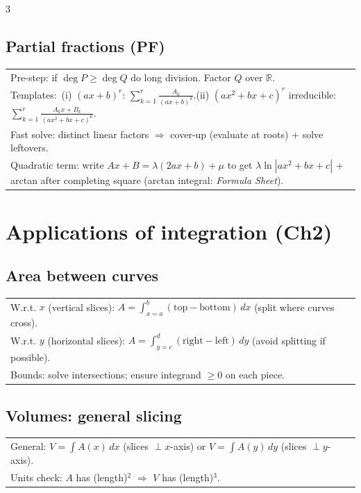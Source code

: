 \documentclass[10pt]{article}
\newcommand{\R}{\mathbb{R}}
\newcommand{\FS}{\textit{Formula Sheet}}
\begin{document}
\begin{multicols}{3}
\subsection*{Partial fractions (PF)}
\vspace{-1pt}
\begin{tabular}{@{}p{}@{}}
Pre-step: if $\deg P\ge\deg Q$ do long division. Factor $Q$ over $\R$.\\
Templates:\ (i) $(ax+b)^r$: $\sum_{k=1}^r \frac{A_k}{(ax+b)^k}$.\quad (ii) $(ax^2+bx+c)^r$ irreducible: $\sum_{k=1}^r \frac{A_k x+B_k}{(ax^2+bx+c)^k}$.\\
Fast solve: distinct linear factors $\Rightarrow$ cover-up (evaluate at roots) + solve leftovers.\\
Quadratic term: write $Ax+B=\lambda(2ax+b)+\mu$ to get $\lambda\ln|ax^2+bx+c|$ + arctan after completing square (arctan integral: \FS).\\
\end{tabular}

\section*{Applications of integration (Ch2)}
\subsection*{Area between curves}
\vspace{-1pt}
\begin{tabular}{@{}p{}@{}}
W.r.t. $x$ (vertical slices): $A=\int_{x=a}^{b}(\text{top}-\text{bottom})\,dx$ (split where curves cross).\\
W.r.t. $y$ (horizontal slices): $A=\int_{y=c}^{d}(\text{right}-\text{left})\,dy$ (avoid splitting if possible).\\
Bounds: solve intersections; ensure integrand $\ge 0$ on each piece.\\
\end{tabular}

\subsection*{Volumes: general slicing}
\vspace{-1pt}
\begin{tabular}{@{}p{}@{}}
General: $V=\int A(x)\,dx$ (slices $\perp x$-axis) or $V=\int A(y)\,dy$ (slices $\perp y$-axis).\\
Units check: $A$ has (length)$^2$ $\Rightarrow$ $V$ has (length)$^3$.\\
\end{tabular}


\end{multicols}
\end{document}
